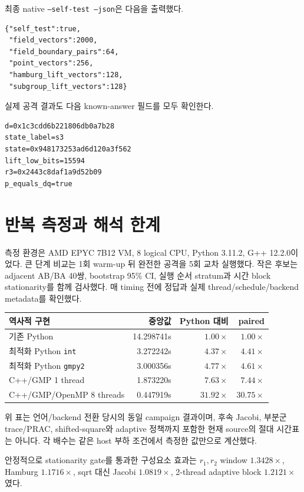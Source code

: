 \documentclass[10pt,a4paper]{article}
\begin{document}
최종 native \texttt{--self-test --json}은 다음을 출력했다.

\begin{lstlisting}
{"self_test":true,
 "field_vectors":2000,
 "field_boundary_pairs":64,
 "point_vectors":256,
 "hamburg_lift_vectors":128,
 "subgroup_lift_vectors":128}
\end{lstlisting}

실제 공격 결과도 다음 known-answer 필드를 모두 확인한다.

\begin{lstlisting}
d=0x1c3cdd6b221806db0a7b28
state_label=s3
state=0x948173253ad6d120a3f562
lift_low_bits=15594
r3=0x2443c8daf1a9d52b09
p_equals_dq=true
\end{lstlisting}

\section{반복 측정과 해석 한계}

측정 환경은 AMD EPYC 7B12 VM, 8 logical CPU, Python 3.11.2,
G++ 12.2.0이었다. 큰 단계 비교는 1회 warm-up 뒤 완전한 공격을 5회
교차 실행했다. 작은 후보는 adjacent AB/BA 40쌍, bootstrap 95\% CI,
실행 순서 stratum과 시간 block stationarity를 함께 검사했다. 매 timing
전에 정답과 실제 thread/schedule/backend metadata를 확인했다.

\begin{tabularx}{\linewidth}{@{}Xrrr@{}}
\toprule
역사적 구현 & 중앙값 & Python 대비 & paired\\
\midrule
기존 Python & 14.298741s & \(1.00\times\) & \(1.00\times\)\\
최적화 Python \texttt{int} & 3.272242s & \(4.37\times\) & \(4.41\times\)\\
최적화 Python \texttt{gmpy2} & 3.000356s & \(4.77\times\) & \(4.61\times\)\\
C++/GMP 1 thread & 1.873220s & \(7.63\times\) & \(7.44\times\)\\
C++/GMP/OpenMP 8 threads & 0.447919s & \(31.92\times\) & \(30.75\times\)\\
\bottomrule
\end{tabularx}

위 표는 언어/backend 전환 당시의 동일 campaign 결과이며, 후속 Jacobi,
부분군 trace/PRAC, shifted-square와 adaptive 정책까지 포함한 현재
source의 절대 시간표는 아니다. 각 배수는 같은 host 부하 조건에서 측정한
값만으로 계산했다.

안정적으로 stationarity gate를 통과한 구성요소 효과는
\(r_1,r_2\) window \(1.3428\times\),
Hamburg \(1.1716\times\), sqrt 대신 Jacobi \(1.0819\times\),
2-thread adaptive block \(1.2121\times\)였다.
\end{document}
